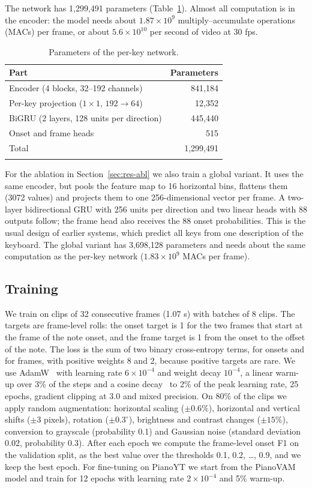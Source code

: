 \documentclass[pdflatex,sn-mathphys-num]{sn-jnl}
\begin{document}
The network has 1,299,491 parameters (Table~\ref{tab:params}). Almost all computation is in the encoder: the model needs about $1.87\times10^{9}$ multiply--accumulate operations (MACs) per frame, or about $5.6\times10^{10}$ per second of video at 30 fps.

\begin{table}[h]
\caption{Parameters of the per-key network.}\label{tab:params}
\begin{tabular}{@{}lr@{}}
\toprule
Part & Parameters \\
\midrule
Encoder (4 blocks, 32--192 channels) & 841,184 \\
Per-key projection ($1\times1$, $192\to64$) & 12,352 \\
BiGRU (2 layers, 128 units per direction) & 445,440 \\
Onset and frame heads & 515 \\
\midrule
Total & 1,299,491 \\
\botrule
\end{tabular}
\end{table}

For the ablation in Section~\ref{sec:res-abl} we also train a global variant. It uses the same encoder, but pools the feature map to 16 horizontal bins, flattens them (3072 values) and projects them to one 256-dimensional vector per frame. A two-layer bidirectional GRU with 256 units per direction and two linear heads with 88 outputs follow; the frame head also receives the 88 onset probabilities. This is the usual design of earlier systems, which predict all keys from one description of the keyboard. The global variant has 3,698,128 parameters and needs about the same computation as the per-key network ($1.83\times10^{9}$ MACs per frame).

\subsection{Training}

We train on clips of 32 consecutive frames (1.07 s) with batches of 8 clips. The targets are frame-level rolls: the onset target is 1 for the two frames that start at the frame of the note onset, and the frame target is 1 from the onset to the offset of the note. The loss is the sum of two binary cross-entropy terms, for onsets and for frames, with positive weights 8 and 2, because positive targets are rare. We use AdamW~\cite{loshchilov2019} with learning rate $6\times10^{-4}$ and weight decay $10^{-4}$, a linear warm-up over 3\% of the steps and a cosine decay~\cite{loshchilov2017} to 2\% of the peak learning rate, 25 epochs, gradient clipping at 3.0 and mixed precision. On 80\% of the clips we apply random augmentation: horizontal scaling ($\pm0.6$\%), horizontal and vertical shifts ($\pm3$ pixels), rotation ($\pm0.3^\circ$), brightness and contrast changes ($\pm15$\%), conversion to grayscale (probability 0.1) and Gaussian noise (standard deviation 0.02, probability 0.3). After each epoch we compute the frame-level onset F1 on the validation split, as the best value over the thresholds 0.1, 0.2, \dots, 0.9, and we keep the best epoch. For fine-tuning on PianoYT we start from the PianoVAM model and train for 12 epochs with learning rate $2\times10^{-4}$ and 5\% warm-up.
\end{document}
